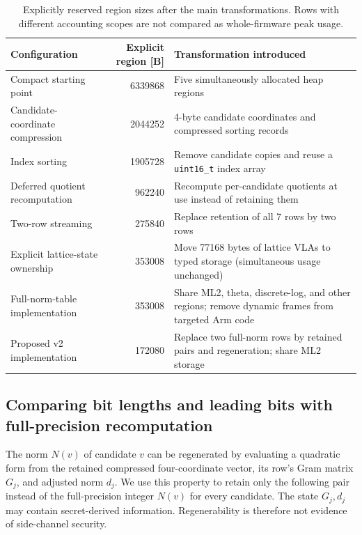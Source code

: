 \documentclass[a4paper,10pt]{article}
\theoremstyle{definition}
\theoremstyle{remark}
\begin{document}
\begin{table}[H]
  \centering
  \caption{Explicitly reserved region sizes after the main transformations. Rows with different accounting scopes are not compared as whole-firmware peak usage.}
  \label{tab:ablation}
  \scriptsize
  \begin{tabularx}{\linewidth}{@{}l r X@{}}
    \toprule
    Configuration & Explicit region [B] & Transformation introduced \\
    \midrule
    Compact starting point & \num{6339868} & Five simultaneously allocated heap regions \\
    Candidate-coordinate compression & \num{2044252} & 4-byte candidate coordinates and compressed sorting records \\
    Index sorting & \num{1905728} & Remove candidate copies and reuse a \texttt{uint16\_t} index array \\
    Deferred quotient recomputation & \num{962240} & Recompute per-candidate quotients at use instead of retaining them \\
    Two-row streaming & \num{275840} & Replace retention of all 7 rows by two rows \\
    Explicit lattice-state ownership & \num{353008} & Move \num{77168} bytes of lattice VLAs to typed storage (simultaneous usage unchanged) \\
    Full-norm-table implementation & \num{353008} & Share ML2, theta, discrete-log, and other regions; remove dynamic frames from targeted Arm code \\
    Proposed v2 implementation & \num{172080} & Replace two full-norm rows by retained pairs and regeneration; share ML2 storage \\
    \bottomrule
  \end{tabularx}
\end{table}

\subsection{Comparing bit lengths and leading bits with full-precision recomputation}
\label{sec:sketch}

The norm $N(v)$ of candidate $v$ can be regenerated by evaluating a quadratic form from the retained compressed four-coordinate vector, its row's Gram matrix $G_j$, and adjusted norm $d_j$. We use this property to retain only the following pair instead of the full-precision integer $N(v)$ for every candidate. The state $G_j,d_j$ may contain secret-derived information. Regenerability is therefore not evidence of side-channel security.
\end{document}
